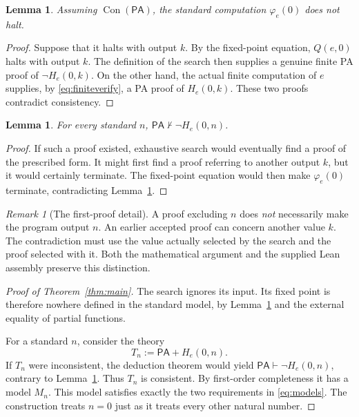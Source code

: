 \documentclass[11pt]{article}
\newcommand{\PA}{\mathsf{PA}}
\newcommand{\Con}{\operatorname{Con}}
\newtheorem{lemma}[theorem]{Lemma}
\theoremstyle{definition}
\theoremstyle{remark}
\newtheorem{remark}[theorem]{Remark}
\begin{document}
\begin{lemma}\label{lem:nohalt}
Assuming $\Con(\PA)$, the standard computation $\varphi_e(0)$ does not
halt.
\end{lemma}
\begin{proof}
Suppose that it halts with output $k$. By the fixed-point equation,
$Q(e,0)$ halts with output $k$. The definition of the search then supplies
a genuine finite PA proof of $\neg H_e(0,k)$. On the other hand, the
actual finite computation of $e$ supplies, by
\eqref{eq:finiteverify}, a PA proof of $H_e(0,k)$. These two proofs
contradict consistency.
\end{proof}

\begin{lemma}\label{lem:unrefuted}
For every standard $n$, $\PA\nvdash\neg H_e(0,n)$.
\end{lemma}
\begin{proof}
If such a proof existed, exhaustive search would eventually find a proof
of the prescribed form. It might first find a proof referring to another
output $k$, but it would certainly terminate. The fixed-point equation
would then make $\varphi_e(0)$ terminate, contradicting
Lemma~\ref{lem:nohalt}.
\end{proof}

\begin{remark}[The first-proof detail]
A proof excluding $n$ does \emph{not} necessarily make the program output
$n$. An earlier accepted proof can concern another value $k$. The
contradiction must use the value actually selected by the search and the
proof selected with it. Both the mathematical argument and the supplied
Lean assembly preserve this distinction.
\end{remark}

\begin{proof}[Proof of Theorem~\ref{thm:main}]
The search ignores its input. Its fixed point is therefore nowhere
defined in the standard model, by Lemma~\ref{lem:nohalt} and the
external equality of partial functions.

For a standard $n$, consider the theory
\[
 T_n:=\PA+H_e(0,n).
\]
If $T_n$ were inconsistent, the deduction theorem would yield
$\PA\vdash\neg H_e(0,n)$, contrary to
Lemma~\ref{lem:unrefuted}. Thus $T_n$ is consistent. By first-order
completeness it has a model $M_n$. This model satisfies exactly the two
requirements in \eqref{eq:models}. The construction treats $n=0$ just as
it treats every other natural number.
\end{proof}
\end{document}
